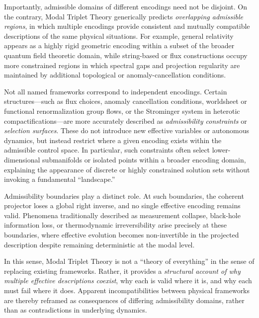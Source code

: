 \documentclass[11pt]{article}
\begin{document}
Importantly, admissible domains of different encodings need not be disjoint. On the
contrary, Modal Triplet Theory generically predicts \emph{overlapping admissible regions},
in which multiple encodings provide consistent and mutually compatible descriptions of the
same physical situations. For example, general relativity appears as a highly rigid geometric
encoding within a subset of the broader quantum field theoretic domain, while string-based
or flux constructions occupy more constrained regions in which spectral gaps and projection
regularity are maintained by additional topological or anomaly-cancellation conditions.

Not all named frameworks correspond to independent encodings. Certain structures—such as
flux choices, anomaly cancellation conditions, worldsheet or functional renormalization group
flows, or the Strominger system in heterotic compactifications—are more accurately described
as \emph{admissibility constraints} or \emph{selection surfaces}. These do not introduce new
effective variables or autonomous dynamics, but instead restrict where a given encoding
exists within the admissible control space. In particular, such constraints often select
lower-dimensional submanifolds or isolated points within a broader encoding domain,
explaining the appearance of discrete or highly constrained solution sets without invoking a
fundamental ``landscape.''

Admissibility boundaries play a distinct role. At such boundaries, the coherent projector
loses a global right inverse, and no single effective encoding remains valid. Phenomena
traditionally described as measurement collapse, black-hole information loss, or
thermodynamic irreversibility arise precisely at these boundaries, where effective evolution
becomes non-invertible in the projected description despite remaining deterministic at the
modal level.

In this sense, Modal Triplet Theory is not a ``theory of everything'' in the sense of replacing
existing frameworks. Rather, it provides a \emph{structural account of why multiple effective
descriptions coexist}, why each is valid where it is, and why each must fail where it does.
Apparent incompatibilities between physical frameworks are thereby reframed as consequences
of differing admissibility domains, rather than as contradictions in underlying dynamics.

\end{document}
